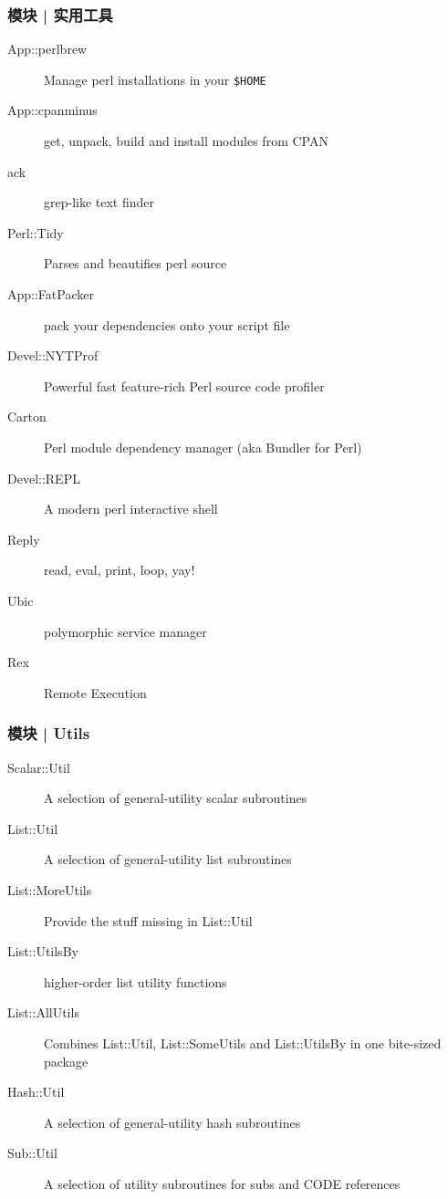 \begin{frame}[fragile]
  \frametitle{模块 | 实用工具}
    \begin{description}
      \item[App::perlbrew] Manage perl installations in your \verb|$HOME| 
      \item[App::cpanminus] get, unpack, build and install modules from CPAN
      \item[ack] grep-like text finder
      \item[Perl::Tidy] Parses and beautifies perl source
      \item[App::FatPacker] pack your dependencies onto your script file
      \item[Devel::NYTProf] Powerful fast feature-rich Perl source code profiler
      \item[Carton] Perl module dependency manager (aka Bundler for Perl)
      \item[Devel::REPL] A modern perl interactive shell
      \item[Reply] read, eval, print, loop, yay!
      \item[Ubic] polymorphic service manager
      \item[Rex] Remote Execution
    \end{description}
\end{frame}

\begin{frame}
  \frametitle{模块 | Utils}
    \begin{description}
      \item[Scalar::Util] A selection of general-utility scalar subroutines
      \item[List::Util] A selection of general-utility list subroutines
      \item[List::MoreUtils] Provide the stuff missing in List::Util
      \item[List::UtilsBy] higher-order list utility functions
      \item[List::AllUtils] Combines List::Util, List::SomeUtils and List::UtilsBy in one bite-sized package
      \item[Hash::Util] A selection of general-utility hash subroutines
      \item[Sub::Util] A selection of utility subroutines for subs and CODE references
    \end{description}
\end{frame}

